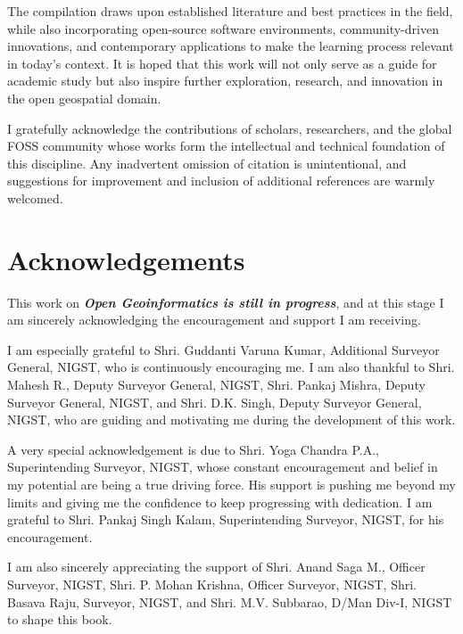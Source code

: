 \documentclass[
  11pt,
  letterpaper,
]{book}
\begin{document}
The compilation draws upon established literature and best practices in
the field, while also incorporating open-source software environments,
community-driven innovations, and contemporary applications to make the
learning process relevant in today's context. It is hoped that this work
will not only serve as a guide for academic study but also inspire
further exploration, research, and innovation in the open geospatial
domain.

I gratefully acknowledge the contributions of scholars, researchers, and
the global FOSS community whose works form the intellectual and
technical foundation of this discipline. Any inadvertent omission of
citation is unintentional, and suggestions for improvement and inclusion
of additional references are warmly welcomed.


\chapter*{Acknowledgements}\label{acknowledgements}


This work on \textbf{\emph{Open Geoinformatics is still in progress}},
and at this stage I am sincerely acknowledging the encouragement and
support I am receiving.

I am especially grateful to Shri. Guddanti Varuna Kumar, Additional
Surveyor General, NIGST, who is continuously encouraging me. I am also
thankful to Shri. Mahesh R., Deputy Surveyor General, NIGST, Shri.
Pankaj Mishra, Deputy Surveyor General, NIGST, and Shri. D.K. Singh,
Deputy Surveyor General, NIGST, who are guiding and motivating me during
the development of this work.

A very special acknowledgement is due to Shri. Yoga Chandra P.A.,
Superintending Surveyor, NIGST, whose constant encouragement and belief
in my potential are being a true driving force. His support is pushing
me beyond my limits and giving me the confidence to keep progressing
with dedication. I am grateful to Shri. Pankaj Singh Kalam,
Superintending Surveyor, NIGST, for his encouragement.

I am also sincerely appreciating the support of Shri. Anand Saga M.,
Officer Surveyor, NIGST, Shri. P. Mohan Krishna, Officer Surveyor,
NIGST, Shri. Basava Raju, Surveyor, NIGST, and Shri. M.V. Subbarao,
D/Man Div-I, NIGST to shape this book.
\end{document}
